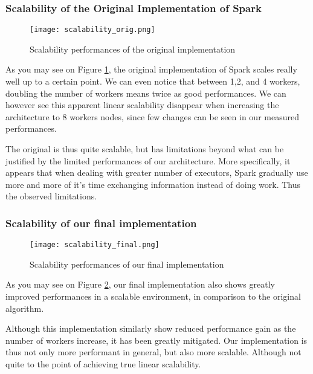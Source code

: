 \documentclass{eplmastersthesis}
\begin{document}
\subsubsection{Scalability of the Original Implementation of Spark}

\begin{figure}[h]
  \centering
  \texttt{[image: scalability\_orig.png]}
  \caption{Scalability performances of the original implementation}
  \label{fig:scal_orig}
\end{figure}

As you may see on Figure \ref{fig:scal_orig}, the original implementation of Spark scales really well up to a certain point. We can even notice that between 1,2, and 4 workers, doubling the number of workers means twice as good performances. We can however see this apparent linear scalability disappear when increasing the architecture to 8 workers nodes, since few changes can be seen in our measured performances. \newline

The original is thus quite scalable, but has limitations beyond what can be justified by the limited performances of our architecture. More specifically, it appears that when dealing with greater number of executors, Spark gradually use more and more of it's time exchanging information instead of doing work. Thus the observed limitations. \newline

\subsubsection{Scalability of our final implementation}

\begin{figure}[h]
  \centering
  \texttt{[image: scalability\_final.png]}
  \caption{Scalability performances of our final implementation}
  \label{fig:scal_final}
\end{figure}

As you may see on Figure \ref{fig:scal_final}, our final implementation also shows greatly improved performances in a scalable environment, in comparison to the original algorithm. \newline

Although this implementation similarly show reduced performance gain as the number of workers increase, it has been greatly mitigated. Our implementation is thus not only more performant in general, but also more scalable. Although not quite to the point of achieving true linear scalability. \newline
\end{document}
